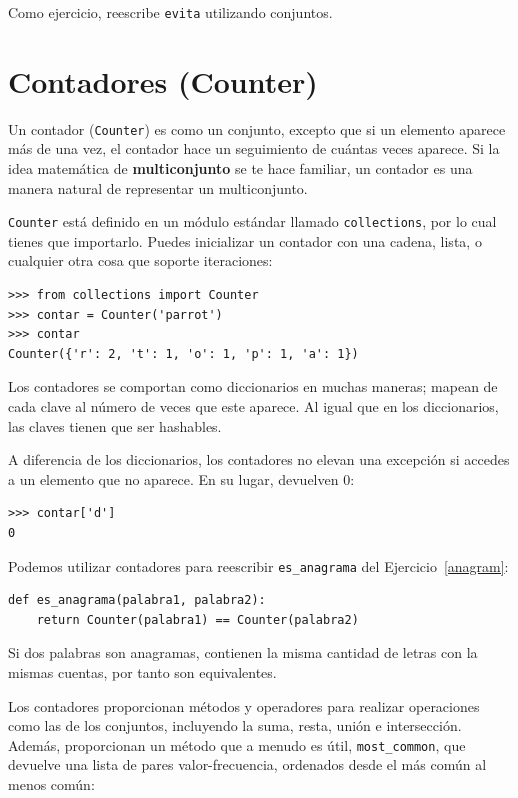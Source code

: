 \documentclass[10pt]{book}
\begin{document}
Como ejercicio, reescribe \verb"evita" utilizando conjuntos.


\section{Contadores (Counter)}

Un contador ({\tt Counter}) es como un conjunto, excepto que si un elemento aparece más
de una vez, el contador hace un seguimiento de cuántas veces aparece.
Si la idea matemática de {\bf multiconjunto} se te hace familiar,
un contador es una manera natural de representar un multiconjunto.

{\tt Counter} está definido en un módulo estándar llamado {\tt collections},
por lo cual tienes que importarlo.  Puedes inicializar un contador con una cadena,
lista, o cualquier otra cosa que soporte iteraciones:

\begin{verbatim}
>>> from collections import Counter
>>> contar = Counter('parrot')
>>> contar
Counter({'r': 2, 't': 1, 'o': 1, 'p': 1, 'a': 1})
\end{verbatim}

Los contadores se comportan como diccionarios en muchas maneras; mapean de cada
clave al número de veces que este aparece.  Al igual que en los diccionarios,
las claves tienen que ser hashables.

A diferencia de los diccionarios, los contadores no elevan una excepción si accedes a
un elemento que no aparece.  En su lugar, devuelven 0:

\begin{verbatim}
>>> contar['d']
0
\end{verbatim}

Podemos utilizar contadores para reescribir \verb"es_anagrama" del
Ejercicio~\ref{anagram}:

\begin{verbatim}
def es_anagrama(palabra1, palabra2):
    return Counter(palabra1) == Counter(palabra2)
\end{verbatim}

Si dos palabras son anagramas, contienen la misma cantidad de letras con la mismas
cuentas, por tanto son equivalentes.

Los contadores proporcionan métodos y operadores para realizar operaciones como las de los conjuntos,
incluyendo la suma, resta, unión e intersección.  Además,
proporcionan un método que a menudo es útil, \verb"most_common", que
devuelve una lista de pares valor-frecuencia, ordenados desde el más común al
menos común:
\end{document}
